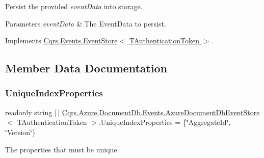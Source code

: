 Persist the provided {\itshape event\+Data}  into storage. 


\begin{DoxyParams}{Parameters}
{\em event\+Data} & The Event\+Data to persist.\\
\hline
\end{DoxyParams}


Implements \hyperlink{classCqrs_1_1Events_1_1EventStore_aedb71ca0ddf21220e323bc60ad7508cd_aedb71ca0ddf21220e323bc60ad7508cd}{Cqrs.\+Events.\+Event\+Store$<$ T\+Authentication\+Token $>$}.



\subsection{Member Data Documentation}
\mbox{\label{classCqrs_1_1Azure_1_1DocumentDb_1_1Events_1_1AzureDocumentDbEventStore_ab2a2b5dd046487edc33917983587d847_ab2a2b5dd046487edc33917983587d847}} 
\subsubsection{\texorpdfstring{Unique\+Index\+Properties}{UniqueIndexProperties}}
{\footnotesize\ttfamily readonly string \mbox{[}$\,$\mbox{]} \hyperlink{classCqrs_1_1Azure_1_1DocumentDb_1_1Events_1_1AzureDocumentDbEventStore}{Cqrs.\+Azure.\+Document\+Db.\+Events.\+Azure\+Document\+Db\+Event\+Store}$<$ T\+Authentication\+Token $>$.Unique\+Index\+Properties = \{\char`\"{}Aggregate\+Id\char`\"{}, \char`\"{}Version\char`\"{}\}\hspace{0.3cm}{\ttfamily [protected]}}



The properties that must be unique. 



